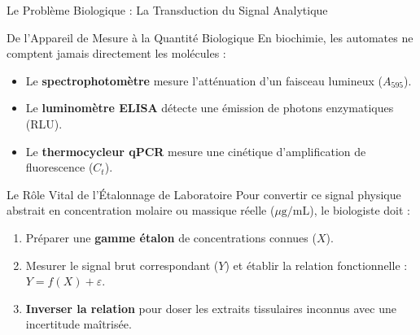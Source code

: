 \documentclass[aspectratio=169,10pt]{beamer}
\begin{document}
\begin{frame}{Le Problème Biologique : La Transduction du Signal Analytique}
  \begin{biobox}{De l'Appareil de Mesure à la Quantité Biologique}
    \footnotesize
    En biochimie, les automates ne comptent jamais directement les molécules :
    \begin{itemize}
      \item Le \textbf{spectrophotomètre} mesure l'atténuation d'un faisceau lumineux ($A_{595}$).
      \item Le \textbf{luminomètre ELISA} détecte une émission de photons enzymatiques (RLU).
      \item Le \textbf{thermocycleur qPCR} mesure une cinétique d'amplification de fluorescence ($C_t$).
    \end{itemize}
  \end{biobox}
  \vspace{1mm}
  \begin{conceptbox}{Le Rôle Vital de l'Étalonnage de Laboratoire}
    \footnotesize
    Pour convertir ce signal physique abstrait en concentration molaire ou massique réelle ($\mu\text{g/mL}$), le biologiste doit :
    \begin{enumerate}
      \item Préparer une \textbf{gamme étalon} de concentrations connues ($X$).
      \item Mesurer le signal brut correspondant ($Y$) et établir la relation fonctionnelle : $Y = f(X) + \varepsilon$.
      \item \textbf{Inverser la relation} pour doser les extraits tissulaires inconnus avec une incertitude maîtrisée.
    \end{enumerate}
  \end{conceptbox}
\end{frame}
\end{document}
